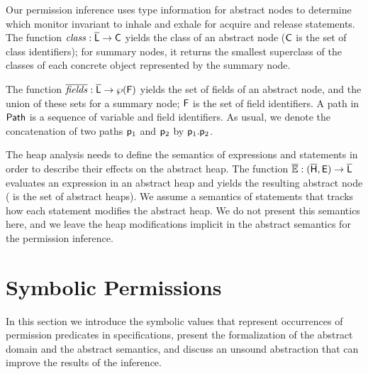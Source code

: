 \documentclass{llncs}
\begin{document}
Our permission inference uses type information for abstract nodes to
determine which monitor invariant to inhale and exhale for acquire and
release statements. The function
$\mathit{class}:\mathsf{\overline{L}} \rightarrow\mathsf{C}$ yields the class of
an abstract node ($\mathsf{C}$ is the set of class identifiers); for
summary nodes, it returns the smallest superclass of
the classes of each concrete object represented by the summary node.

The function $\overline{\mathit{fields}}:\mathsf{\overline{L}} \rightarrow\wp(\mathsf{F})$
yields the set of fields of an abstract node, and the union of these
sets for a summary node; $\mathsf{F}$ is the set of field identifiers.
A path in $\mathsf{Path}$ is a sequence of variable and field identifiers. As
usual, we denote the concatenation of
two paths $\mathsf{p}_1$ and $\mathsf{p}_2$ by
$\mathsf{p}_1.\mathsf{p}_2$.  

The heap analysis needs to define the semantics of expressions and
statements in order to describe their effects on the abstract heap.
The function $\overline{\mathit{\mathbb{E}}} :
(\mathsf{\overline{H}}, \mathsf{E}) \rightarrow\mathsf{\overline{L}}$ evaluates an expression in
an abstract heap and yields the resulting abstract node ( is
the set of abstract heaps). We assume a semantics of statements that
tracks how each statement modifies the abstract heap. We do not
present this semantics here, and we leave the heap modifications
implicit in the abstract semantics for the permission inference.







\goup
\section{Symbolic Permissions}
\goup
\label{sect:abstractdomain}

In this section we introduce the symbolic values that represent
occurrences of permission predicates in specifications, present the
formalization of the abstract domain and the abstract semantics, and
discuss an unsound abstraction that can improve the results of the
inference.
\end{document}
